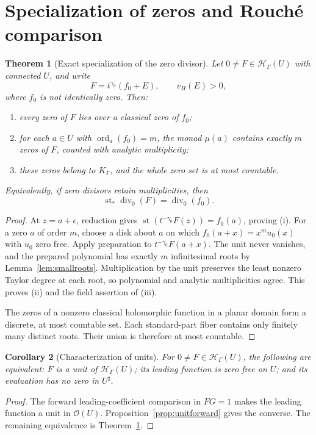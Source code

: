 \documentclass[11pt,a4paper]{article}
\newtheorem{theorem}{Theorem}[section]
\newtheorem{corollary}[theorem]{Corollary}
\theoremstyle{definition}
\theoremstyle{remark}
\newcommand{\OO}{\mathcal O}
\newcommand{\HH}{\mathcal H}
\newcommand{\st}{\operatorname{st}}
\newcommand{\ord}{\operatorname{ord}}
\begin{document}
\section{Specialization of zeros and Rouch\'e comparison}\label{sec:zeros}
\begin{theorem}[Exact specialization of the zero divisor]\label{thm:zeros}
Let $0\ne F\in\HH_\Gamma(U)$ with connected $U$, and write
\[
 F=t^{\gamma_0}(f_0+E),\qquad v_H(E)>0,
\]
where $f_0$ is not identically zero. Then:
\begin{enumerate}[label=(\roman*)]
\item every zero of $F$ lies over a classical zero of $f_0$;
\item for each $a\in U$ with $\ord_a(f_0)=m$, the monad $\mu(a)$
contains exactly $m$ zeros of $F$, counted with analytic multiplicity;
\item these zeros belong to $K_\Gamma$, and the whole zero set is
at most countable.
\end{enumerate}
Equivalently, if zero divisors retain multiplicities, then
\begin{equation}\label{eq:divspecialization}
 \st_*\operatorname{div}_0(F)=\operatorname{div}_0(f_0).
\end{equation}
\end{theorem}
\begin{proof}
At $z=a+\epsilon$, reduction gives
$\st(t^{-\gamma_0}F(z))=f_0(a)$, proving (i).
For a zero $a$ of order $m$, choose a disk about $a$ on which
$f_0(a+x)=x^m u_0(x)$ with $u_0$ zero free. Apply preparation to
$t^{-\gamma_0}F(a+x)$. The unit never vanishes, and the prepared
polynomial has exactly $m$ infinitesimal roots by
Lemma~\ref{lem:smallroots}. Multiplication by the unit preserves
the least nonzero Taylor degree at each root, so polynomial and
analytic multiplicities agree. This proves (ii) and the field
assertion of (iii).

The zeros of a nonzero classical holomorphic function in a planar
domain form a discrete, at most countable set. Each standard-part
fiber contains only finitely many distinct roots. Their union is
therefore at most countable.
\end{proof}

\begin{corollary}[Characterization of units]\label{cor:units}
For $0\ne F\in\HH_\Gamma(U)$, the following are equivalent:
$F$ is a unit of $\HH_\Gamma(U)$; its leading function is zero free
on $U$; and its evaluation has no zero in $U^\sharp$.
\end{corollary}
\begin{proof}
The forward leading-coefficient comparison in $FG=1$ makes the
leading function a unit in $\OO(U)$. Proposition~\ref{prop:unitforward}
gives the converse. The remaining equivalence is
Theorem~\ref{thm:zeros}.
\end{proof}
\end{document}
